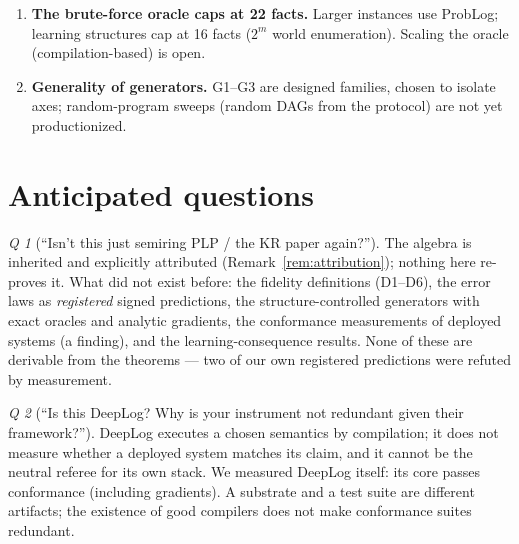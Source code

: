\documentclass[10pt]{article}
\theoremstyle{remark}
\newtheorem{question}{Q}
\begin{document}
\begin{enumerate}[leftmargin=2em]
replication is \emph{internal} (shared seeds and math). External anchors: ProbLog agreement
($10^{-16}$), Scallop agreement ($10^{-16}$), DeepLog agreement ($10^{-7}$), each on independent
codebases. Our adapters could still misuse an upstream API; for the Scallop finding we therefore located the mechanism in its evaluation policy and built a minimal witness, rather than resting on
black-box disagreement.
\item \textbf{The brute-force oracle caps at 22 facts.} Larger instances use ProbLog; learning
structures cap at 16 facts ($2^m$ world enumeration). Scaling the oracle (compilation-based) is open.
\item \textbf{Generality of generators.} G1--G3 are designed families, chosen to isolate axes;
random-program sweeps (random DAGs from the protocol) are not yet productionized.
\end{enumerate}

\section{Anticipated questions}\label{sec:faq}

\begin{question}[``Isn't this just semiring PLP / the KR paper again?'']
The algebra is inherited and explicitly attributed (Remark~\ref{rem:attribution}); nothing here
re-proves it. What did not exist before: the fidelity definitions (D1--D6), the error laws as
\emph{registered} signed predictions, the structure-controlled generators with exact oracles and
analytic gradients, the conformance measurements of deployed systems (a finding), and the
learning-consequence results. None of these are derivable from the theorems --- two of our own
registered predictions were refuted by measurement.
\end{question}

\begin{question}[``Is this DeepLog? Why is your instrument not redundant given their framework?'']
DeepLog executes a chosen semantics by compilation; it does not measure whether a deployed system
matches its claim, and it cannot be the neutral referee for its own stack. We measured DeepLog
itself: its core passes conformance (including gradients). A substrate and a test suite are different artifacts;
the existence of good compilers does not make conformance suites redundant.
\end{question}
\end{document}
